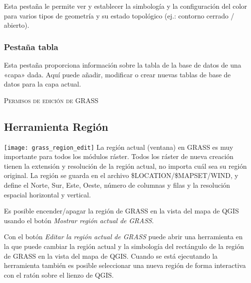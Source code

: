 Esta pestaña le permite ver y establecer la simbología y la configuración del color para varios tipos de geometría y su estado topológico (ej.: contorno cerrado / abierto).

\subsubsection{Pestaña tabla} 
Esta pestaña proporciona información sobre la tabla de la base de datos de una «capa» dada. Aquí puede añadir, modificar o crear nuevas tablas de base de datos para la capa actual.

\begin{Tip}\caption{\textsc{Permisos de edición de GRASS}}
\end{Tip} 

\subsection{Herramienta Región}

\texttt{[image: grass\_region\_edit]} La región actual (ventana) en GRASS es muy importante para todos los módulos ráster. Todos los ráster de nueva creación tienen la extensión y resolución de la región actual, no importa cuál sea su región original. La región se guarda en el archivo \$LOCATION/\$MAPSET/WIND, y define el Norte, Sur, Este, Oeste, número de columnas y filas y la resolución espacial horizontal y vertical.

Es posible encender/apagar la región de GRASS en la vista del mapa de QGIS usando el botón \textsl{Mostrar región actual de GRASS}. 

Con el botón \textsl{Editar la región actual de GRASS} puede abrir una herramienta en la que puede cambiar la región actual y la simbología del rectángulo de la región de GRASS en la vista del mapa de QGIS. Cuando se está ejecutando la herramienta también es posible seleccionar una nueva región de forma interactiva con el ratón sobre el lienzo de QGIS.


